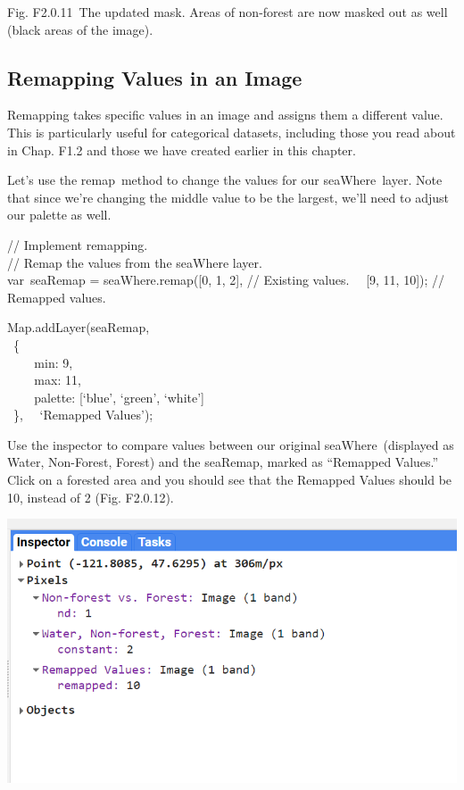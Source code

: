 \documentclass[
  letterpaper,
  DIV=11,
  numbers=noendperiod]{scrreprt}
\begin{document}
Fig. F2.0.11~The updated mask. Areas of non-forest are now masked out as
well (black areas of the image).

\hypertarget{remapping-values-in-an-image}{%
\subsection{Remapping Values in an
Image}\label{remapping-values-in-an-image}}

Remapping takes specific values in an image and assigns them a different
value. This is particularly useful for categorical datasets, including
those you read about in Chap. F1.2 and those we have created earlier in
this chapter.

Let's use the remap~method to change the values for our seaWhere~layer.
Note that since we're changing the middle value to be the largest, we'll
need to adjust our palette as well.

// Implement remapping.\\
// Remap the values from the seaWhere layer.\\
var~seaRemap = seaWhere.remap({[}0, 1, 2{]}, // Existing values.~ ~{[}9,
11, 10{]}); // Remapped values.

Map.addLayer(seaRemap,\\
\hspace*{0.333em} ~\{\\
\hspace*{0.333em} ~ ~ ~min: 9,\\
\hspace*{0.333em} ~ ~ ~max: 11,\\
\hspace*{0.333em} ~ ~ ~palette: {[}`blue', `green', `white'{]}\\
\hspace*{0.333em} ~\},~ ~`Remapped Values');

Use the inspector to compare values between our original
seaWhere~(displayed as Water, Non-Forest, Forest) and the seaRemap,
marked as ``Remapped Values.'' Click on a forested area and you should
see that the Remapped Values should be 10, instead of 2 (Fig. F2.0.12).

\includegraphics{./F2/image28.png}
\end{document}
